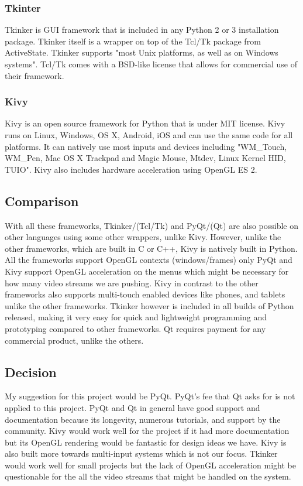 \documentclass[onecolumn, draftclsnofoot, 10pt, compsoc]{IEEEtran}
\begin{document}
\subsubsection{Tkinter}
Tkinker is GUI framework that is included in any Python 2 or 3 installation package.
Tkinker itself is a wrapper on top of the Tcl/Tk package from ActiveState. \cite{Tkinker}
Tkinker supports "most Unix platforms, as well as on Windows systems". \cite{Tkinker}
Tcl/Tk comes with a BSD-like license that allows for commercial use of their framework.

\subsubsection{Kivy}
Kivy is an open source framework for Python that is under MIT license. \cite{Kivy}
Kivy runs on Linux, Windows, OS X, Android, iOS and can use the same code for all platforms.
It can natively use most inputs and devices including "WM\_Touch, WM\_Pen, Mac OS X Trackpad and Magic Mouse, Mtdev, Linux Kernel HID, TUIO". \cite{Kivy}
Kivy also includes hardware acceleration using OpenGL ES 2.

\subsection{Comparison}
With all these frameworks, Tkinker/(Tcl/Tk) and PyQt/(Qt) are also possible on other languages using some other wrappers, unlike Kivy.
However, unlike the other frameworks, which are built in C or C++, Kivy is natively built in Python.
All the frameworks support OpenGL contexts (windows/frames) only PyQt and Kivy support OpenGL acceleration on the menus which might be necessary for how many video streams we are pushing.
Kivy in contrast to the other frameworks also supports multi-touch enabled devices like phones, and tablets unlike the other frameworks.
Tkinker however is included in all builds of Python released, making it very easy for quick and lightweight programming and prototyping compared to other frameworks.
Qt requires payment for any commercial product, unlike the others.

\subsection{Decision}
My suggestion for this project would be PyQt.
PyQt's fee that Qt asks for is not applied to this project.
PyQt and Qt in general have good support and documentation because its longevity, numerous tutorials, and support by the community.
Kivy would work well for the project if it had more documentation but its OpenGL rendering would be fantastic for design ideas we have.
Kivy is also built more towards multi-input systems which is not our focus.
Tkinker would work well for small projects but the lack of OpenGL acceleration might be questionable for the all the video streams that might be handled on the system.
\end{document}
